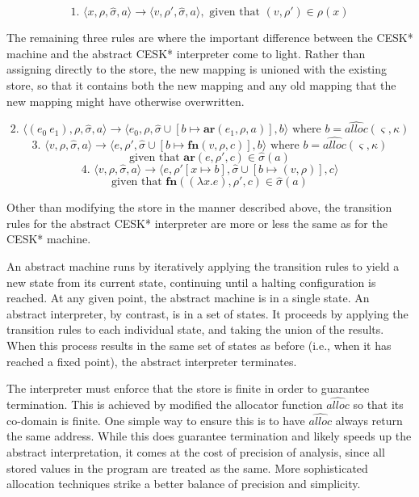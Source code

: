 \documentclass{article}
\begin{document}
$$
\text{1. }
\langle x, \rho, \hat{\sigma}, a \rangle
\to
\langle v, \rho', \hat{\sigma}, a \rangle,
\text{ given that $(v, \rho') \in \rho(x)$}
$$

The remaining three rules are where the important difference between the CESK* machine and the abstract CESK* interpreter come to light. Rather than assigning directly to the store, the new mapping is unioned with the existing store, so that it contains both the new mapping and any old mapping that the new mapping might have otherwise overwritten.

$$
\text{2. }
\langle (e_0\ e_1), \rho, \hat{\sigma}, a \rangle
\to
\langle e_0, \rho, \hat{\sigma} \cup [b \mapsto \textbf{ar}(e_1, \rho, a)], b \rangle
\text{ where $b = \widehat{alloc}(\varsigma, \kappa)$}
$$
$$
\text{3. }
\langle v, \rho, \hat{\sigma}, a \rangle
\to
\langle e, \rho', \hat{\sigma} \cup [b \mapsto \textbf{fn}(v, \rho, c)], b \rangle
\text{ where $b = \widehat{alloc}(\varsigma, \kappa)$}
$$
$$
\text{given that } \textbf{ar}(e, \rho', c) \in \hat{\sigma}(a)
$$
$$
\text{4. }
\langle v, \rho, \hat{\sigma}, a \rangle
\to
\langle e, \rho'[x \mapsto b], \hat{\sigma} \cup [b \mapsto (v, \rho)], c \rangle
$$
$$
\text{given that } \textbf{fn}((\lambda x.e), \rho', c) \in \hat{\sigma}(a)
$$

Other than modifying the store in the manner described above, the transition rules for the abstract CESK* interpreter are more or less the same as for the CESK* machine.

An abstract machine runs by iteratively applying the transition rules to yield a new state from its current state, continuing until a halting configuration is reached. At any given point, the abstract machine is in a single state. An abstract interpreter, by contrast, is in a set of states. It proceeds by applying the transition rules to each individual state, and taking the union of the results. When this process results in the same set of states as before (i.e., when it has reached a fixed point), the abstract interpreter terminates.

The interpreter must enforce that the store is finite in order to guarantee termination. This is achieved by modified the allocator function $\widehat{alloc}$ so that its co-domain is finite. One simple way to ensure this is to have $\widehat{alloc}$ always return the same address. While this does guarantee termination and likely speeds up the abstract interpretation, it comes at the cost of precision of analysis, since all stored values in the program are treated as the same. More sophisticated allocation techniques strike a better balance of precision and simplicity.
\end{document}
